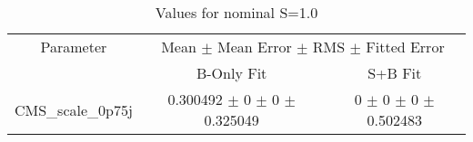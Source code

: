 \begin{table}
\centering
\caption{Values for nominal S=1.0}
\begin{tabular}{ccc}
\toprule
Parameter & \multicolumn{2}{c}{Mean $\pm$ Mean Error $\pm$ RMS $\pm$ Fitted Error}\\
 & B-Only Fit & S+B Fit\\
\midrule
CMS\_scale\_0p75j & \num{0.300492} $\pm$ \num{0} $\pm$ \num{0} $\pm$ \num{0.325049} & \num{0} $\pm$ \num{0} $\pm$ \num{0} $\pm$ \num{0.502483}\\
\bottomrule
\end{tabular}
\end{table}